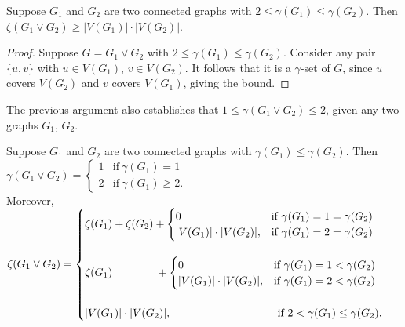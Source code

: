 \documentclass[twoside,12pt]{article}
\begin{document}
\begin{theorem}{\label{T3}}
	Suppose $G_1$ and $G_2$ are two connected graphs with $2\le \gamma(G_1)\le \gamma(G_2)$. Then $\zeta(G_1\vee G_2)\ge |V(G_1)|\cdot|V(G_2)|$.
\end{theorem}

\begin{proof}
	Suppose $G=G_1\vee G_2$ with $2\le \gamma(G_1)\le \gamma(G_2)$. Consider any pair $\{u,v\}$ with $u\in V(G_1)$, $v\in V(G_2)$. It follows that it is a $\gamma$-set of $G$, since $u$ covers $V(G_2)$ and $v$ covers $V(G_1)$, giving the bound. 
\end{proof}
The previous argument also establishes that $1\le \gamma(G_1\vee G_2)\le 2$, given any two graphs $G_1$, $G_2$. 


\begin{theorem}{\label{T4}}
	Suppose $G_1$ and $G_2$ are two connected graphs with $\gamma(G_1)\le \gamma(G_2)$. Then  \\
	$\gamma(G_1\vee G_2)=\begin{cases} 
	1 &  \text{if} \  \gamma(G_1)=1  \\
	2 & \text{if}  \ \gamma(G_1)\ge 2.
	\end{cases}$
	\\
	Moreover,
	\\
	$\zeta(G_1\vee G_2)=\begin{cases} 
	\zeta(G_1)+\zeta(G_2)+ \begin{cases} 
	0 & \text{if} \  \gamma(G_1)=1=\gamma(G_2) \\
	|V(G_1)|\cdot|V(G_2)| , &  \text{if} \  \gamma(G_1)=2=\gamma(G_2)  
	\end{cases} 
	\\
	\\
	\zeta(G_1) \hspace{.55in} +\begin{cases} 
	0 & \text{if} \  \gamma(G_1)=1<\gamma(G_2) \\
	|V(G_1)|\cdot|V(G_2)| , &  \text{if} \  \gamma(G_1)=2<\gamma(G_2)  
	
\end{cases} 
\\
\\
|V(G_1)|\cdot|V(G_2)|,   \hspace{1.25in} \ \ \text{if} \  2<\gamma(G_1)\le \gamma(G_2).	
\end{cases}$
\end{theorem}
\end{document}
